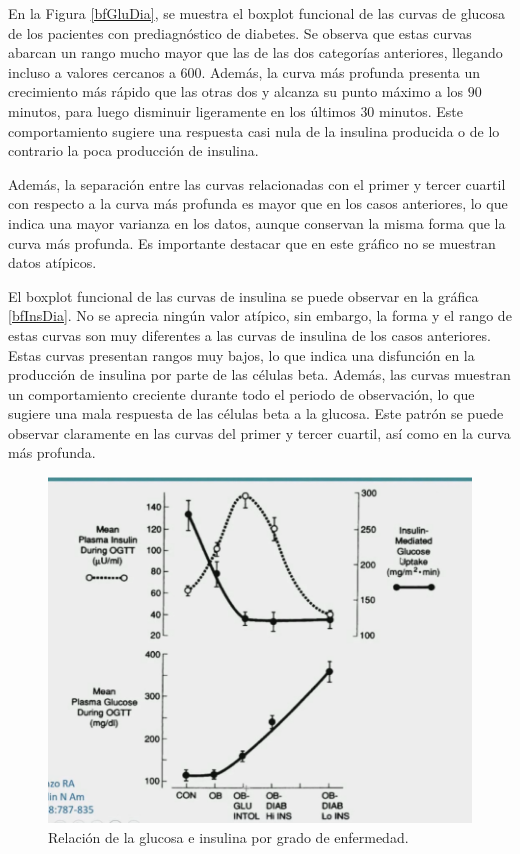 En la Figura \ref{bfGluDia}, se muestra el boxplot funcional de las curvas de glucosa de los pacientes con prediagnóstico de diabetes. Se observa que estas curvas abarcan un rango mucho mayor que las de las dos categorías anteriores, llegando incluso a valores cercanos a $600$. Además, la curva más profunda presenta un crecimiento más rápido que las otras dos y alcanza su punto máximo a los $90$ minutos, para luego disminuir ligeramente en los últimos $30$ minutos. Este comportamiento sugiere una respuesta casi nula de la insulina producida o de lo contrario la poca producción de insulina. 

Además, la separación entre las curvas relacionadas con el primer y tercer cuartil con respecto a la curva más profunda es mayor que en los casos anteriores, lo que indica una mayor varianza en los datos, aunque conservan la misma forma que la curva más profunda. Es importante destacar que en este gráfico no se muestran datos atípicos.

El boxplot funcional de las curvas de insulina se puede observar en la gráfica \ref{bfInsDia}. No se aprecia ningún valor atípico, sin embargo, la forma y el rango de estas curvas son muy diferentes a las curvas de insulina de los casos anteriores. Estas curvas presentan rangos muy bajos, lo que indica una disfunción en la producción de insulina por parte de las células beta. Además, las curvas muestran un comportamiento creciente durante todo el periodo de observación, lo que sugiere una mala respuesta de las células beta a la glucosa.  Este patrón se puede observar claramente en las curvas del primer y tercer cuartil, así como en la curva más profunda.

\begin{figure}[H]
    \centering
    \includegraphics[width = 0.9 \textwidth]{Imagenes/InsulinaGlucosa.png}
    \caption{Relación de la glucosa e insulina por grado de enfermedad.}
    \label{fig:relGluIns}
\end{figure}

